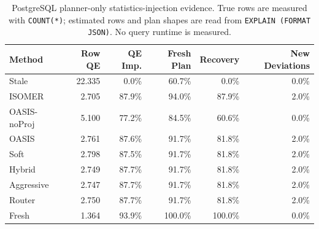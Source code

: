 \begin{table}[t]
  \centering
  \small
  \caption{PostgreSQL planner-only statistics-injection evidence. True rows are measured with \texttt{COUNT(*)}; estimated rows and plan shapes are read from \texttt{EXPLAIN (FORMAT JSON)}. No query runtime is measured.}
  \label{tab:postgres_planner_stats_injection}
  \setlength{\tabcolsep}{4pt}
  \begin{tabular}{lrrrrr}
    \toprule
    Method & Row QE & QE Imp. & Fresh Plan & Recovery & New Deviations \\
    \midrule
    Stale & 22.335 & 0.0\% & 60.7\% & 0.0\% & 0.0\% \\
    ISOMER & 2.705 & 87.9\% & 94.0\% & 87.9\% & 2.0\% \\
    OASIS-noProj & 5.100 & 77.2\% & 84.5\% & 60.6\% & 0.0\% \\
    OASIS & 2.761 & 87.6\% & 91.7\% & 81.8\% & 2.0\% \\
    Soft & 2.798 & 87.5\% & 91.7\% & 81.8\% & 2.0\% \\
    Hybrid & 2.749 & 87.7\% & 91.7\% & 81.8\% & 2.0\% \\
    Aggressive & 2.747 & 87.7\% & 91.7\% & 81.8\% & 2.0\% \\
    Router & 2.750 & 87.7\% & 91.7\% & 81.8\% & 2.0\% \\
    Fresh & 1.364 & 93.9\% & 100.0\% & 100.0\% & 0.0\% \\
    \bottomrule
  \end{tabular}
\end{table}
